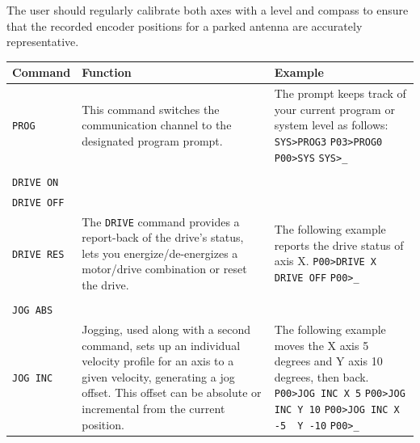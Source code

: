 \documentclass[titlepage]{article}
\begin{document}
The user should regularly calibrate both axes with a level and compass to ensure that the recorded encoder positions for a parked antenna are accurately representative.

\begin{table}[ht]
  \begin{center}
    \begin{tabularx}{\linewidth}{l|>{\raggedright\arraybackslash}X|>{\raggedright\arraybackslash}X}
      Command          & Function & Example \\ \hline

      \lstinline|PROG| &
      This command switches the communication channel to the designated
      program prompt. &
      The prompt keeps track of your current program or system level as follows: \newline
      \lstinline|SYS>PROG3| \newline
      \lstinline|P03>PROG0| \newline
      \lstinline|P00>SYS| \newline
      \lstinline|SYS>_|
      \\ \hline

      \makecell[lt]{
        \lstinline|DRIVE| \\
        \lstinline|DRIVE ON| \\
        \lstinline|DRIVE OFF| \\
        \lstinline|DRIVE RES|
      } &
      The \lstinline|DRIVE| command provides a report-back of the drive's status, lets you
      energize/de-energizes a motor/drive combination or reset the drive. &
      The following example reports the drive status of axis X. \newline
      \lstinline|P00>DRIVE X| \newline
      \lstinline|DRIVE OFF| \newline
      \lstinline|P00>_|
      \\ \hline

      \makecell[lt]{
        \lstinline|JOG| \\
        \lstinline|JOG ABS| \\
        \lstinline|JOG INC|
      } &
      Jogging, used along with a second command, sets up an individual velocity profile for an axis to a given velocity, generating a jog offset. This offset can be absolute or incremental from the current position. &
      The following example moves the X axis 5 degrees and Y axis 10 degrees, then back. \newline
      \lstinline|P00>JOG INC X 5| \newline
      \lstinline|P00>JOG INC Y 10| \newline
      \lstinline|P00>JOG INC X -5  Y -10| \newline
      \lstinline|P00>_|
      \\ \hline


\end{tabularx}
\end{center}
\end{table}
\end{document}
